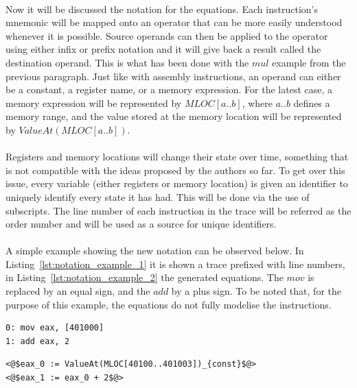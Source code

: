 \paragraph{}
Now it will be discussed the notation for the equations. Each instruction's mnemonic will be mapped onto an operator that can be more easily understood whenever it is possible. Source operands can then be applied to the operator using either infix or prefix notation and it will give back a result called the destination operand. This is what has been done with the $mul$ example from the previous paragraph. Just like with assembly instructions, an operand can either be a constant, a register name, or a memory expression. For the latest case, a memory expression will be represented by $MLOC[a..b]$, where $a..b$ defines a memory range, and the value stored at the memory location will be represented by $ValueAt(MLOC[a..b])$.

\paragraph{}
Registers and memory locations will change their state over time, something that is not compatible with the ideas proposed by the authors so far. To get over this issue, every variable (either registers or memory location) is given an identifier to uniquely identify every state it has had. This will be done via the use of subscripts. The line number of each instruction in the trace will be referred as the order number and will be used as a source for unique identifiers.

\paragraph{}
A simple example showing the new notation can be observed below. In Listing~\ref{lst:notation_example_1} it is shown a trace prefixed with line numbers, in Listing~\ref{lst:notation_example_2} the generated equations. The $mov$ is replaced by an equal sign, and the $add$ by a plus sign. To be noted that, for the purpose of this example, the equations do not fully modelise the instructions. \\

\begin{lstlisting}[caption={A sample of trace.}, label={lst:notation_example_1}, frame=tlrb, language={[x86masm]Assembler}]
0: mov eax, [401000]
1: add eax, 2
\end{lstlisting}

\begin{lstlisting}[caption={A partial translation of the trace from Listing~\ref{lst:notation_example_1}.}, label={lst:notation_example_2}, frame=tlrb, language={[x86masm]Assembler}]
<@$eax_0 := ValueAt(MLOC[40100..401003])_{const}$@>
<@$eax_1 := eax_0 + 2$@>
\end{lstlisting}


